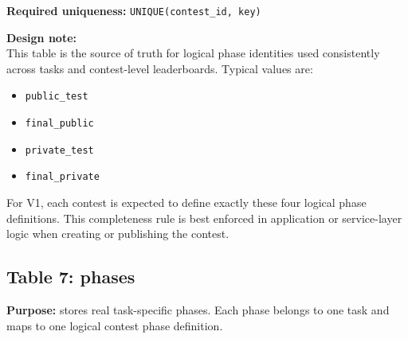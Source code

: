 \documentclass[11pt,a4paper]{article}
\begin{document}
\textbf{Required uniqueness:} \texttt{UNIQUE(contest\_id, key)}

\textbf{Design note:}\\
This table is the source of truth for logical phase identities used consistently across tasks and contest-level leaderboards. Typical values are:
\begin{itemize}
    \item \texttt{public\_test}
    \item \texttt{final\_public}
    \item \texttt{private\_test}
    \item \texttt{final\_private}
\end{itemize}

For V1, each contest is expected to define exactly these four logical phase definitions. This completeness rule is best enforced in application or service-layer logic when creating or publishing the contest.

\subsection{Table 7: phases}
\textbf{Purpose:} stores real task-specific phases. Each phase belongs to one task and maps to one logical contest phase definition.
\end{document}
